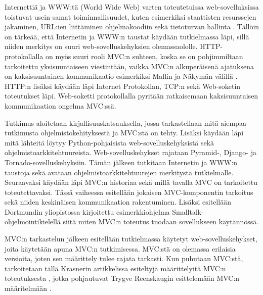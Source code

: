 \documentclass[utf8]{gradu3}
\begin{document}
Internettiä ja WWW:tä (World Wide Web) varten toteutetuissa web-sovelluksissa toistuvat usein samat toiminnallisuudet, kuten esimerkiksi staattisten resurssejen jakaminen, URL:ien liittäminen ohjelmakoodiin sekä tietoturvan hallinta \parencite{pyramid_intr}. Tällöin on tärkeää, että Internetin ja WWW:n taustat käydään tutkielmassa läpi, sillä niiden merkitys on suuri web-sovelluskehyksien olemassaololle. HTTP-protokollalla on myös suuri rooli MVC:n suhteen, koska se on pohjimmiltaan tarkoitettu yksisuuntaiseen viestintään, vaikka MVC:n alkuperäisenä ajatuksena on kaksisuuntainen kommunikaatio esimerkiksi Mallin ja Näkymän välillä \parencite{reenskaug_tools}. HTTP:n lisäksi käydään läpi Internet Protokollan, TCP:n sekä Web-soketin toteutukset läpi. Web-soketti protokollalla pyritään ratkaisemaan kaksisuuntaisen kommunikaation ongelma MVC:ssä.

Tutkimus aloitetaan kirjallisuuskatsauksella, jossa tarkastellaan mitä aiempaa 
tutkimusta ohjelmistokehityksestä ja MVC:stä on tehty. Lisäksi käydään
läpi mitä lähteitä löytyy Python-pohjaisista web-sovelluskehyksistä sekä ohjelmistoarkkitehtuureista. Web-sovelluskehykset rajataan 
Pyramid-, Django- ja Tornado-sovelluskehyksiin. Tämän jälkeen tutkitaan Internetin ja WWW:n taustoja sekä avataan ohjelmistoarkkitehtuurejen merkitystä tutkielmalle. Seuraavaksi käydään läpi MVC:n historiaa sekä millä tavalla MVC on tarkoitettu toteutettavaksi. Tässä vaiheessa esitellään jokaisen MVC-komponentin tarkoitus sekä niiden 
keskinäisen kommunikaation rakentuminen. Lisäksi esitellään
Dortmundin yliopistossa kirjoitettu esimerkkiohjelma Smalltalk-ohjelmointikielellä siitä miten MVC:n 
toteutus tuodaan sovellukseen käytännössä.

MVC:n tarkastelun jälkeen esitellään tutkielmassa käytetyt web-sovelluskehykset, 
joita käytetään apuna MVC:n tutkimisessa. MVC:stä on olemassa erilaisia versioita, joten sen määrittely tulee rajata tarkasti.
Kun puhutaan MVC:stä, tarkoitetaan tällä Krasnerin artikkelissa esiteltyjä määrittelyitä MVC:n toteutuksesta \parencite{krasner}, jotka pohjautuvat Trygve Reenskaugin esittelemään 
MVC:n määritelmään \parencite{xerox-original}. 
\end{document}
